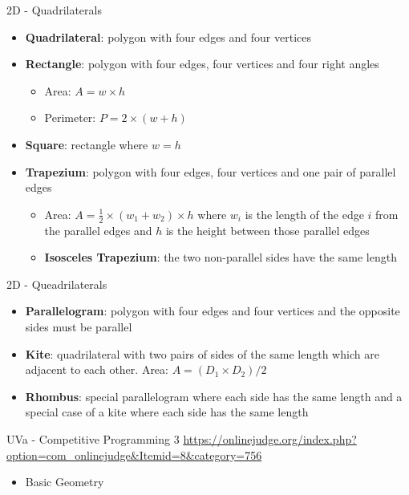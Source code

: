 \documentclass{beamer}
\begin{document}
\begin{frame}{2D - Quadrilaterals}
    \begin{itemize}
        \item \textbf{Quadrilateral}: polygon with four edges and four vertices
        \item \textbf{Rectangle}: polygon with four edges, four vertices and four right angles
            \begin{itemize}
                \item Area: $A = w\times h$
                \item Perimeter: $P = 2\times (w + h)$
            \end{itemize}
        \item \textbf{Square}: rectangle where $w=h$
        \item \textbf{Trapezium}: polygon with four edges, four vertices and one pair of parallel edges
            \begin{itemize}
                \item Area: $A = \frac{1}{2} \times (w_1 + w_2) \times h$ where $w_i$ is the length of the edge $i$ from the parallel edges and $h$ is the height between those parallel edges
                \item \textbf{Isosceles Trapezium}: the two non-parallel sides have the same length
            \end{itemize}
    \end{itemize}
\end{frame}

\begin{frame}{2D - Queadrilaterals}
    \begin{itemize}
        \item \textbf{Parallelogram}: polygon with four edges and four vertices and the opposite sides must be parallel
        \item \textbf{Kite}: quadrilateral with two pairs of sides of the same length which are adjacent to each other. Area: $A = (D_1 \times D_2 )/2$
        \item \textbf{Rhombus}: special parallelogram where each side has the same length and a special case of a kite where each side has the same length
    \end{itemize}
\end{frame}

\begin{frame}{UVa - Competitive Programming 3}
    \url{https://onlinejudge.org/index.php?option=com_onlinejudge&Itemid=8&category=756}
    \begin{itemize}
        \item Basic Geometry
    \end{itemize}
\end{frame}
\end{document}
